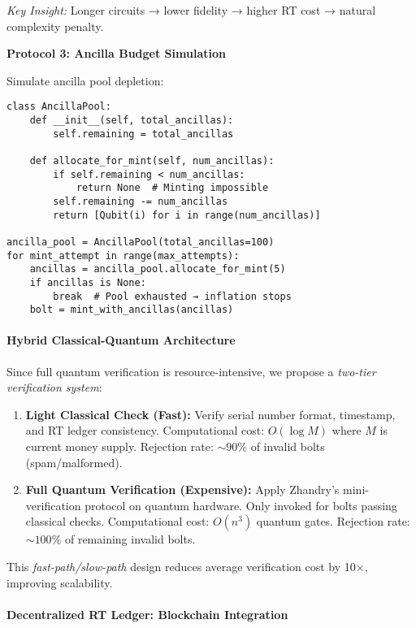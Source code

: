 \documentclass[a4paper,10.5pt,twoside]{article}
\begin{document}
\textit{Key Insight:} Longer circuits → lower fidelity → higher RT cost → natural complexity penalty.

\textbf{Protocol 3: Ancilla Budget Simulation}

Simulate ancilla pool depletion:
\begin{verbatim}
class AncillaPool:
    def __init__(self, total_ancillas):
        self.remaining = total_ancillas
    
    def allocate_for_mint(self, num_ancillas):
        if self.remaining < num_ancillas:
            return None  # Minting impossible
        self.remaining -= num_ancillas
        return [Qubit(i) for i in range(num_ancillas)]

ancilla_pool = AncillaPool(total_ancillas=100)
for mint_attempt in range(max_attempts):
    ancillas = ancilla_pool.allocate_for_mint(5)
    if ancillas is None:
        break  # Pool exhausted → inflation stops
    bolt = mint_with_ancillas(ancillas)
\end{verbatim}

\paragraph{Hybrid Classical-Quantum Architecture}

Since full quantum verification is resource-intensive, we propose a \textit{two-tier verification system}:

\begin{enumerate}
    \item \textbf{Light Classical Check (Fast):}  
    Verify serial number format, timestamp, and RT ledger consistency.  
    Computational cost: $O(\log M)$ where $M$ is current money supply.  
    Rejection rate: $\sim 90\%$ of invalid bolts (spam/malformed).
    
    \item \textbf{Full Quantum Verification (Expensive):}  
    Apply Zhandry's mini-verification protocol on quantum hardware.  
    Only invoked for bolts passing classical checks.  
    Computational cost: $O(n^3)$ quantum gates.  
    Rejection rate: $\sim 100\%$ of remaining invalid bolts.
\end{enumerate}

This \textit{fast-path/slow-path} design reduces average verification cost by 10×, improving scalability.

\paragraph{Decentralized RT Ledger: Blockchain Integration}
\end{document}
